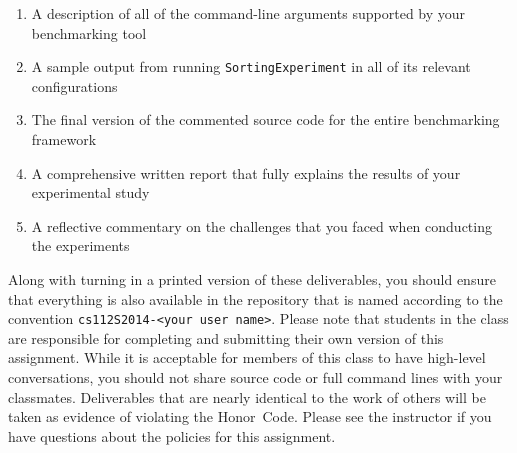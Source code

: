   \begin{enumerate} 
  \itemsep0pt

  \item A description of all of the command-line arguments supported by your benchmarking tool 

  \item A sample output from running {\tt SortingExperiment} in all of its relevant configurations

  \item The final version of the commented source code for the entire benchmarking framework 

  \item A comprehensive written report that fully explains the results of your experimental study

  \item A reflective commentary on the challenges that you faced when conducting the experiments
   
  \end{enumerate}

  Along with turning in a printed version of these deliverables, you should ensure that everything is also available in
  the repository that is named according to the convention {\tt cs112S2014-<your user name>}. Please note that students
  in the class are responsible for completing and submitting their own version of this assignment.    While it is
  acceptable for members of this class to have high-level conversations, you should not share source code or full
  command lines with your classmates.  Deliverables that are nearly identical to the work of others will be taken as
  evidence of violating the \mbox{Honor Code}.  Please see the instructor if you have questions about the policies for
  this assignment.

  
